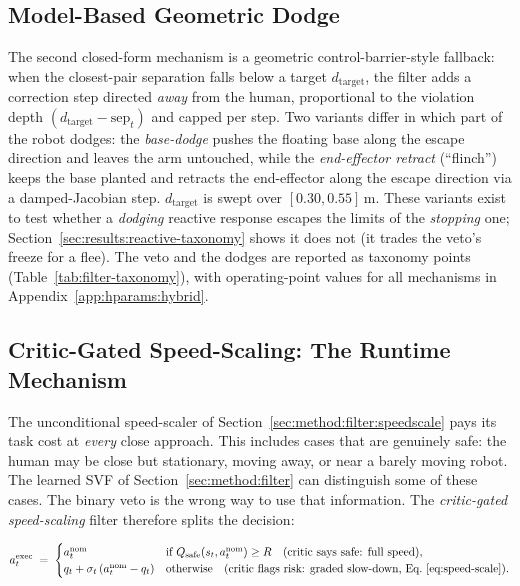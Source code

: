 \documentclass[11pt,a4paper]{report}
\begin{document}
\subsection{Model-Based Geometric Dodge}
\label{sec:method:filter:dodge}

The second closed-form mechanism is a geometric
control-barrier-style fallback: when the closest-pair separation
falls below a target $d_{\mathrm{target}}$, the filter adds a
correction step directed \emph{away} from the human, proportional to
the violation depth $(d_{\mathrm{target}} - \mathrm{sep}_t)$ and
capped per step. Two variants differ in which part of the robot
dodges: the \emph{base-dodge} pushes the floating base along the
escape direction and leaves the arm untouched, while the
\emph{end-effector retract} (``flinch'') keeps the base planted and
retracts the end-effector along the escape direction via a
damped-Jacobian step. $d_{\mathrm{target}}$ is swept over
$[0.30, 0.55]$\,m. These variants exist to test whether a
\emph{dodging} reactive response escapes the limits of the
\emph{stopping} one; Section~\ref{sec:results:reactive-taxonomy}
shows it does not (it trades the veto's freeze for a flee). The
veto and the dodges are reported as taxonomy points
(Table~\ref{tab:filter-taxonomy}), with operating-point values for
all mechanisms in Appendix~\ref{app:hparams:hybrid}.

\subsection{Critic-Gated Speed-Scaling: The Runtime Mechanism}
\label{sec:method:filter:gated}

The unconditional speed-scaler of
Section~\ref{sec:method:filter:speedscale} pays its task cost at
\emph{every} close approach. This includes cases that are genuinely
safe: the human may be close but stationary, moving away, or near a
barely moving robot. The learned SVF of
Section~\ref{sec:method:filter} can distinguish some of these cases.
The binary veto is the wrong way to use that information. The
\emph{critic-gated speed-scaling} filter therefore splits the decision:

\begin{equation}
  a^{\mathrm{exec}}_t \;=\;
  \begin{cases}
    a^{\mathrm{nom}}_t
      & \text{if } Q_{\mathrm{safe}}(s_t, a^{\mathrm{nom}}_t) \ge R
        \quad\text{(critic says safe: full speed)}, \\
    q_t + \sigma_t\,(a^{\mathrm{nom}}_t - q_t)
      & \text{otherwise}
        \quad\text{(critic flags risk: graded slow-down, Eq.~\ref{eq:speed-scale})}.
  \end{cases}
  \label{eq:gated-rule}
\end{equation}
\end{document}
